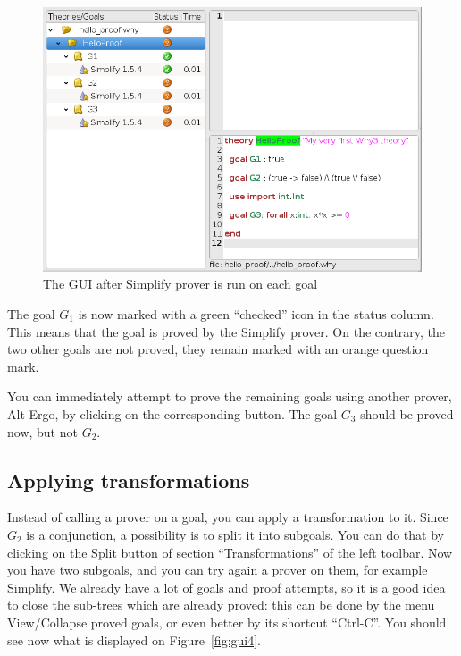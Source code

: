 \begin{figure}[tbp]
\includegraphics[width=\textwidth]{gui-0-70-3.png}
  \caption{The GUI after Simplify prover is run on each goal}
  \label{fig:gui3}
\end{figure}

The goal $G_1$ is now marked with a green ``checked'' icon in the
status column. This means that the goal is proved by the Simplify
prover. On the contrary, the two other goals are not proved, they remain
marked with an orange question mark.

You can immediately attempt to prove the remaining goals using another
prover, {\eg} Alt-Ergo, by clicking on the corresponding button. The
goal $G_3$ should be proved now, but not $G_2$.

\subsection{Applying transformations}

Instead of calling a prover on a goal, you can apply a transformation
to it.  Since $G_2$ is a conjunction, a possibility is to split it
into subgoals. You can do that by clicking on the \textsf{Split}
button of section ``Transformations'' of the left toolbar. Now you
have two subgoals, and you can try again a prover on them, for example
Simplify. We already have a lot of goals and proof attempts, so it is a good idea to close the sub-trees which are already proved: this can be done by the menu \textsf{View/Collapse proved goals}, or even better by its shortcut ``Ctrl-C''.
You should see now what is displayed on Figure~\ref{fig:gui4}.

